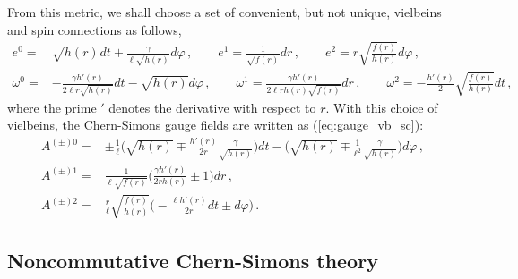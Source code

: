 \documentclass[11pt]{article}
\newcommand{\vap}{\varphi}
\newcommand{\nn}{\nonumber}
\numberwithin{equation}{section}
\begin{document}
From this metric, we shall choose a set of convenient, but not unique, vielbeins and spin connections as follows,
\begin{align}
  e^0 =& 
 \sqrt{h(r)} dt + \frac{\gamma}{\ell \sqrt{h(r)}} d\varphi
\,,\qquad
e^1 = \frac{1}{\sqrt{f(r)}}dr \,,\qquad
e^2=
 r \sqrt{\frac{f(r)}{h(r)}} d\varphi
\,,\\
  \omega^0=& -\frac{\gamma h'(r)}{2\ell r \sqrt{h(r)}} dt - \sqrt{h(r)} d\vap \,,
\qquad
\omega^1= \frac{\gamma h'(r)}{2\ell r h(r) \sqrt{f(r)}} dr \,,
\qquad
\omega^2= -\frac{h'(r)}{2} \sqrt{\frac{f(r)}{h(r)}} dt \,,
\end{align}
where the prime ${}'$ denotes the derivative with respect to $r$.
With this choice of vielbeins, the Chern-Simons gauge fields are written as (\ref{eq:gauge_vb_sc}):
\begin{align}
  A^{(\pm)0}=& \pm \frac{1}{\ell} \bigg( \sqrt{h(r)} \mp \frac{h'(r)}{2r} \frac{\gamma}{\sqrt{h(r)}} \bigg) dt
- \bigg( \sqrt{h(r)} \mp \frac{1}{\ell^2}
               \frac{\gamma}{\sqrt{h(r)}}\bigg) d\vap 
\label{eq:CS_g1}\,,\\
A^{(\pm)1}=&
\frac{1}{\ell \sqrt{f(r)}} \bigg( \frac{\gamma h'(r)}{2 r h(r)} \pm 1 \bigg) dr \,,
\label{eq:CS_g2}
\\
A^{(\pm)2}=& 
\frac{r}{\ell} \sqrt{\frac{f(r)}{h(r)}} 
\bigg( -\frac{\ell h'(r)}{2r} dt \pm d\vap \bigg) \,.
\label{eq:CS_g3}
\end{align}

\subsection{Noncommutative Chern-Simons theory}
\label{sec:nonc-chern-simons}
\end{document}
